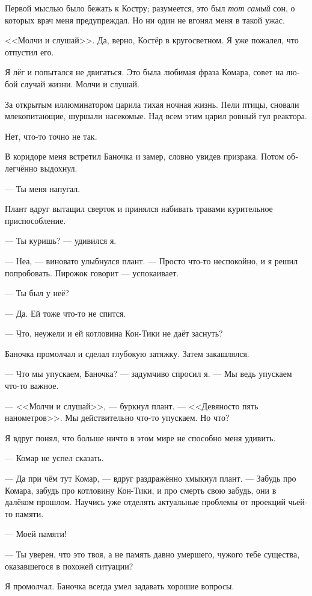 \documentclass[a4paper,12pt,fleqn]{book}\usepackage{cooltooltips}\usepackage{polyglossia}\setdefaultlanguage[babelshorthands=true]{russian}\setotherlanguage{english}\defaultfontfeatures{Ligatures=TeX,Mapping=tex-text} \usepackage{xcolor}\definecolor{lightgray}{HTML}{bbbbbb}\color{lightgray}\newcommand{\ml}[3]{\textenglish{\textcolor{black}{#3}}}
\begin{document}
{Первой мыслью было бежать к Костру;
разумеется, это был \emph{тот самый} сон, о которых врач меня предупреждал.
Но ни один не вгонял меня в такой ужас.

<<Молчи и слушай>>.
Да, верно, Костёр в кругосветном.
Я уже пожалел, что отпустил его.

Я лёг и попытался не двигаться.
Это была любимая фраза Комара, совет на любой случай жизни.
Молчи и слушай.

За открытым иллюминатором царила тихая ночная жизнь.
Пели птицы, сновали млекопитающие, шуршали насекомые.
Над всем этим царил ровный гул реактора.

Нет, что-то точно не так.

В коридоре меня встретил Баночка и замер, словно увидев призрака.
Потом облегчённо выдохнул.

--- Ты меня напугал.

Плант вдруг вытащил сверток и принялся набивать травами курительное приспособление.

--- Ты куришь? --- удивился я.

--- Неа, --- виновато улыбнулся плант.
--- Просто что-то неспокойно, и я решил попробовать.
Пирожок говорит --- успокаивает.

--- Ты был у неё?

--- Да.
Ей тоже что-то не спится.

--- Что, неужели и ей котловина Кон-Тики не даёт заснуть?

Баночка промолчал и сделал глубокую затяжку.
Затем закашлялся.

--- Что мы упускаем, Баночка? --- задумчиво спросил я.
--- Мы ведь упускаем что-то важное.

--- <<Молчи и слушай>>, --- буркнул плант.
--- <<Девяносто пять нанометров>>.
Мы действительно что-то упускаем.
Но что?

Я вдруг понял, что больше ничто в этом мире не способно меня удивить.

--- Комар не успел сказать.

--- Да при чём тут Комар, --- вдруг раздражённо хмыкнул плант.
--- Забудь про Комара, забудь про котловину Кон-Тики, и про смерть свою забудь, они в далёком прошлом.
Научись уже отделять актуальные проблемы от проекций чьей-то памяти.

--- Моей памяти!

--- Ты уверен, что это твоя, а не память давно умершего, чужого тебе существа, оказавшегося в похожей ситуации?

Я промолчал.
Баночка всегда умел задавать хорошие вопросы.

}
\end{document}
